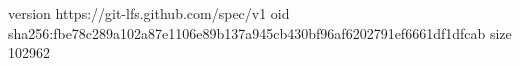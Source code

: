 version https://git-lfs.github.com/spec/v1
oid sha256:fbe78c289a102a87e1106e89b137a945cb430bf96af6202791ef6661df1dfcab
size 102962
